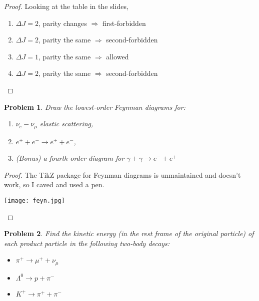 \documentclass{article}
\newtheorem{plm}{Problem}
\begin{document}
\begin{proof}
  Looking at the table in the slides,
  \begin{enumerate}
  \item $\Delta J = 2$, parity changes $\Rightarrow$ first-forbidden
  \item $\Delta J = 2$, parity the same $\Rightarrow$ second-forbidden
  \item $\Delta J = 1$, parity the same $\Rightarrow$ allowed
  \item $\Delta J = 2$, parity the same $\Rightarrow$ second-forbidden
  \end{enumerate}
\end{proof}

\begin{plm}
  Draw the lowest-order Feynman diagrams for:
  \begin{enumerate}
  \item $\nu_{e}-\nu_{\mu}$ elastic scattering,
  \item $e^{+} + e^{-} \to e^{+} + e^{-}$,
  \item (Bonus) a fourth-order diagram for $\gamma + \gamma \to e^{-} + e^{+}$
  \end{enumerate}
\end{plm}

\begin{proof}
  The TikZ package for Feynman diagrams is unmaintained and doesn't work, so I caved and used a pen.
  \begin{center}
    \texttt{[image: feyn.jpg]}
  \end{center}
\end{proof}

\begin{plm}
  Find the kinetic energy (in the rest frame of the original particle) of each product particle in the following two-body decays:
  \begin{itemize}
  \item $\pi^{+} \to \mu^{+} + \nu_{\mu}$
  \item $\Lambda^{0} \to p + \pi^{-}$
  \item $K^{+} \to \pi^{+} + \pi^{-}$
  \end{itemize}
\end{plm}
\end{document}
